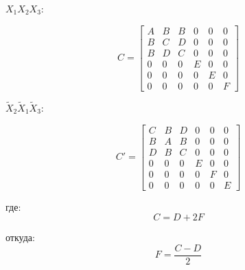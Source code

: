 \vspace{10pt}
\begin{minipage}{0.5\linewidth}
    \begin{center}
        $X_1X_2X_3$:        
    \end{center}
    \begin{equation*}
        \label{eq1.1}
        C = 
        \begin{bmatrix}
            A & B & B & 0 & 0 & 0
            \\
            B & C & D & 0 & 0 & 0
            \\
            B & D & C & 0 & 0 & 0
            \\
            0 & 0 & 0 & E & 0 & 0
            \\
            0 & 0 & 0 & 0 & E & 0
            \\
            0 & 0 & 0 & 0 & 0 & F
        \end{bmatrix}
    \end{equation*}
\end{minipage}
\begin{minipage}{0.5\linewidth}
    \begin{center}
        $\tilde{X}_2 \tilde{X}_1 \tilde{X}_3$:        
    \end{center}
    \begin{equation*}
        \label{eq1.2}
        C' =
        \begin{bmatrix}
            C & B & D & 0 & 0 & 0
            \\
            B & A & B & 0 & 0 & 0
            \\
            D & B & C & 0 & 0 & 0
            \\
            0 & 0 & 0 & E & 0 & 0
            \\
            0 & 0 & 0 & 0 & F & 0
            \\
            0 & 0 & 0 & 0 & 0 & E
        \end{bmatrix}
    \end{equation*}
\end{minipage}

где:
\begin{equation*}
    \label{eq1.3}
    C = D + 2F
\end{equation*}

откуда:
\begin{equation*}
    \label{eq1.4}
    F = \frac{C - D}{2}
\end{equation*}